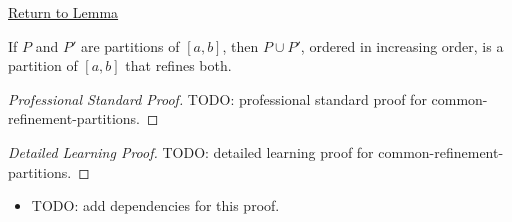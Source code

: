 \newpage
{}
\label{prf:common-refinement-partitions}

\begin{remark*}[Return]
\hyperref[lem:common-refinement-partitions]{Return to Lemma}
\end{remark*}

\begin{lemma*}
If \(P\) and \(P'\) are partitions of \([a,b]\), then \(P\cup P'\), ordered
in increasing order, is a partition of \([a,b]\) that refines both.
\end{lemma*}

\begin{proof}[Professional Standard Proof]
\LRAProofBodyStart
TODO: professional standard proof for common-refinement-partitions.
\end{proof}

\begin{proof}[Detailed Learning Proof]
\LRAProofBodyStart
TODO: detailed learning proof for common-refinement-partitions.
\end{proof}

\begin{remark*}
\end{remark*}

\begin{dependencies}
\begin{itemize}
  \item TODO: add dependencies for this proof.
\end{itemize}
\end{dependencies}

\clearpage
